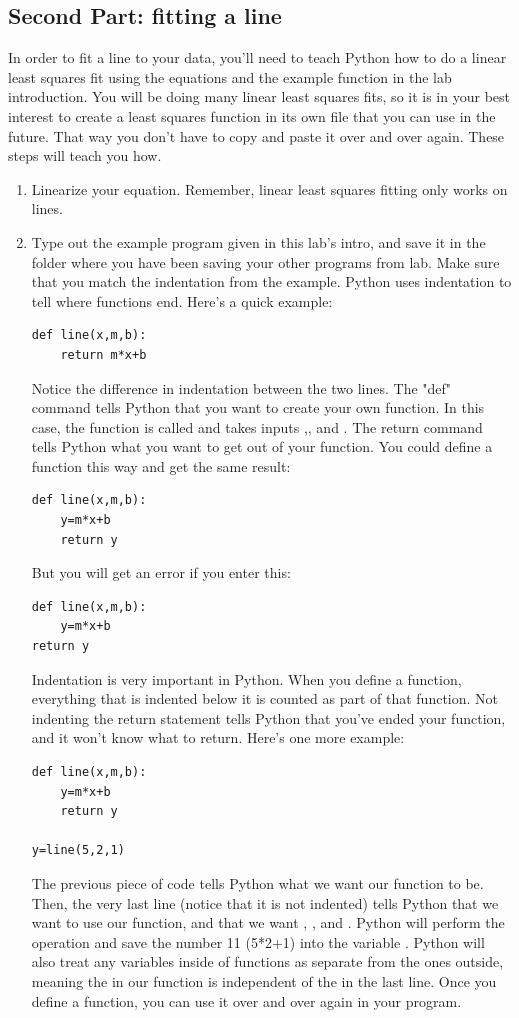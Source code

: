 \documentclass[twoside,11pt,ShortChapTitles]{BYUTextbook}
\begin{document}
\subsection{Second Part: fitting a line}
In order to fit a line to your data, you'll need to teach Python how to do a linear least squares fit using the equations and the example function in the lab introduction.  You will be doing many linear least squares fits, so it is in your best interest to create a least squares function in its own file that you can use in the future.  That way you don't have to copy and paste it over and over again. These steps will teach you how.
\begin{enumerate}
\item Linearize your equation.  Remember, linear least squares fitting only works on lines.
\item Type out the example program given in this lab's intro, and save it in the folder where you have been saving your other programs from lab.  Make sure that you match the indentation from the example.  Python uses indentation to tell where functions end.  Here's a quick example:
\begin{Verbatim}
def line(x,m,b):
    return m*x+b
\end{Verbatim}

Notice the difference in indentation between the two lines. The "def" command tells Python that you want to create your own function.  In this case, the function is called  and takes inputs ,, and .  The return command tells Python what you want to get out of your function.  You could define a function this way and get the same result:

\begin{Verbatim}
def line(x,m,b):
    y=m*x+b
    return y
\end{Verbatim}

But you will get an error if you enter this:
\begin{Verbatim}
def line(x,m,b):
    y=m*x+b
return y
\end{Verbatim}
Indentation is very important in Python.  When you define a function, everything that is indented below it is counted as part of that function.  Not indenting the return statement tells Python that you've ended your function, and it won't know what to return.
Here's one more example:
\begin{Verbatim}
def line(x,m,b):
    y=m*x+b
    return y

y=line(5,2,1)
\end{Verbatim}
The previous piece of code tells Python what we want our function to be.  Then,  the very last line (notice that it is not indented) tells Python that we want to use our function, and that we want , , and .  Python will perform the operation and save the number 11 (5*2+1) into the variable .  Python will also treat any variables inside of functions as separate from the ones outside, meaning the  in our function is independent of the  in the last line. Once you define a function, you can use it over and over again in your program.


\end{enumerate}
\end{document}
